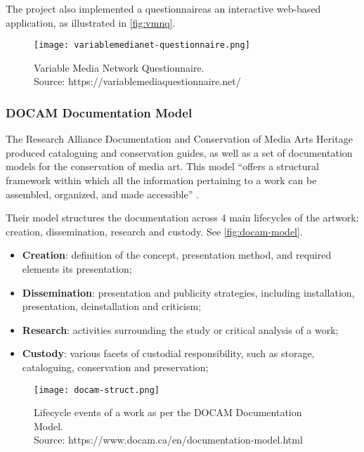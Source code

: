 The project also implemented a questionnaire\footnotemark[7] as an interactive web-based application, as illustrated in \autoref{fig:vmnq}.


\begin{figure}[h]
    \centering
    \captionsetup{justification=centering}
    \texttt{[image: variablemedianet-questionnaire.png]}
    \captionsetup{justification=centering}
    \caption[Variable Media Network Questionnaire]{Variable Media Network Questionnaire. \\ Source: https://variablemediaquestionnaire.net/}
    \label{fig:vmnq}
\end{figure}

\subsubsection{DOCAM Documentation Model}

The Research Alliance Documentation and Conservation of Media Arts Heritage \cite{DOCAM} produced cataloguing and conservation guides, as well as a set of documentation models for the conservation of media art. This model ``offers a structural framework within which all the information pertaining to a work can be assembled, organized, and made accessible'' \cite[p.151]{depocasDocumentingConservingTechnological2013}.

Their model structures the documentation across 4 main lifecycles of the artwork: creation, dissemination, research and custody. See \autoref{fig:docam-model}.

\begin{itemize}
    \item \textbf{Creation}: definition of the concept, presentation method, and required elements its presentation;
    \item \textbf{Dissemination}: presentation and publicity strategies, including installation, presentation, deinstallation and criticism;
    \item \textbf{Research}: activities surrounding the study or critical analysis of a work;
    \item \textbf{Custody}:  various facets of custodial responsibility, such as storage, cataloguing, conservation and preservation;
\end{itemize}


\begin{figure}[h]
    \centering
    \captionsetup{justification=centering}
    \texttt{[image: docam-struct.png]}
    \captionsetup{justification=centering}
    \caption[DOCAM Documentation Model - Lifecycle Events]{Lifecycle events of a work as per the DOCAM Documentation Model. \\ Source: https://www.docam.ca/en/documentation-model.html}
    \label{fig:docam-model}
\end{figure}


